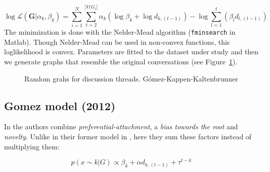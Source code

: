 \documentclass[smallextended]{svjour3}          %
\begin{document}
\begin{equation}
\log \mathcal{L}(\mathbf{G} | \alpha_k, \beta_k)
=
\sum_{i=1}^{N}
\sum_{t=2}^{|V(G_i|}
\alpha_k (\log \beta_k+ \log d_{k,(t-1)}) 
-
\log \sum_{l=1}^{t} (\beta_l d_{l,(t-1)})
\end{equation}
The minimization is done with the Nelder-Mead algorithm (\texttt{fminsearch} in Matlab). Though Nelder-Mead can be used in non-convex functions, this loglikelihood is convex. Parameters are fitted to the dataset under study and then we generate graphs that resemble the original conversations (see Figure~\ref{fig:Gomez}).

	\begin{figure}
		\centering
		\hfill
		\caption{Random grahs for discussion threads. Gómez-Kappen-Kaltenbrunner}
		\label{fig:Gomez}
	\end{figure}

\subsection{Gomez model (2012)}
In \cite{Gomez2012} the authors combine \textit{preferential-attachment}, a \textit{bias towards the root} and \textit{novelty}. Unlike in their former model in \cite{Gomez2010}, here they sum these factors instead of multiplying them:

\begin{equation}
p(x \sim k | G) 
\propto 
\beta_k + \alpha d_{k, (t-1)} + \tau^{t-k}
\end{equation}
\end{document}
